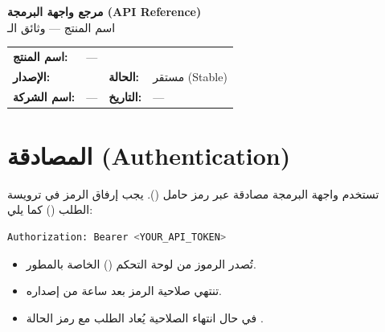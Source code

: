 \documentclass[11pt,a4paper]{article}
\begin{document}
\begin{center}
{\LARGE\bfseries مرجع واجهة البرمجة (API Reference)}\\[0.5em]
{\Large اسم المنتج --- وثائق الـ }\\[1em]
\end{center}

\begin{table}[H]
\centering
\renewcommand{\arraystretch}{1.4}
\begin{tabularx}{\textwidth}{L{3.5cm} X L{3.5cm} L{3cm}}
\toprule
\textbf{اسم المنتج:} &  \\
\textbf{الإصدار:} &  & \textbf{الحالة:} & مستقر (Stable) \\
\textbf{اسم الشركة:} & --- & \textbf{التاريخ:} & --- \\
\bottomrule
\end{tabularx}
\end{table}

\vspace{0.5em}

\section{المصادقة (Authentication)}
\label{sec:auth}

تستخدم واجهة البرمجة مصادقة عبر رمز حامل (). يجب إرفاق الرمز
في ترويسة الطلب () كما يلي:

\begin{english}
\begin{lstlisting}[language=bash]
Authorization: Bearer <YOUR_API_TOKEN>
\end{lstlisting}
\end{english}

\begin{itemize}
    \item تُصدر الرموز من لوحة التحكم () الخاصة بالمطور.
    \item تنتهي صلاحية الرمز بعد  ساعة من إصداره.
    \item في حال انتهاء الصلاحية يُعاد الطلب مع رمز الحالة .
\end{itemize}
\end{document}
